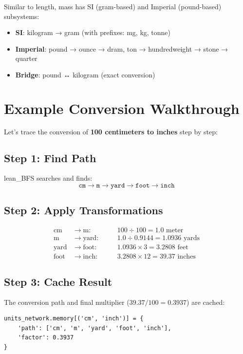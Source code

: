 \documentclass[11pt,a4paper]{report}
\begin{document}
Similar to length, mass has SI (gram-based) and Imperial (pound-based) subsystems:
\begin{itemize}[leftmargin=*]
  \item \textbf{SI}: kilogram → gram (with prefixes: mg, kg, tonne)
  \item \textbf{Imperial}: pound → ounce → dram, ton → hundredweight → stone → quarter
  \item \textbf{Bridge}: pound ↔ kilogram (exact conversion)
\end{itemize}

\section{Example Conversion Walkthrough}

Let's trace the conversion of \textbf{100 centimeters to inches} step by step:

\subsection{Step 1: Find Path}

lean\_BFS searches and finds:
\[
\texttt{cm} \rightarrow \texttt{m} \rightarrow \texttt{yard} \rightarrow \texttt{foot} \rightarrow \texttt{inch}
\]

\subsection{Step 2: Apply Transformations}

\begin{align*}
\text{cm} &\rightarrow \text{m}: \quad && 100 \div 100 = 1.0 \text{ meter} \\
\text{m} &\rightarrow \text{yard}: \quad && 1.0 \div 0.9144 = 1.0936 \text{ yards} \\
\text{yard} &\rightarrow \text{foot}: \quad && 1.0936 \times 3 = 3.2808 \text{ feet} \\
\text{foot} &\rightarrow \text{inch}: \quad && 3.2808 \times 12 = 39.37 \text{ inches}
\end{align*}

\subsection{Step 3: Cache Result}

The conversion path and final multiplier ($39.37 / 100 = 0.3937$) are cached:
\begin{lstlisting}[style=pythonstyle]
units_network.memory[('cm', 'inch')] = {
    'path': ['cm', 'm', 'yard', 'foot', 'inch'],
    'factor': 0.3937
}
\end{lstlisting}
\end{document}
